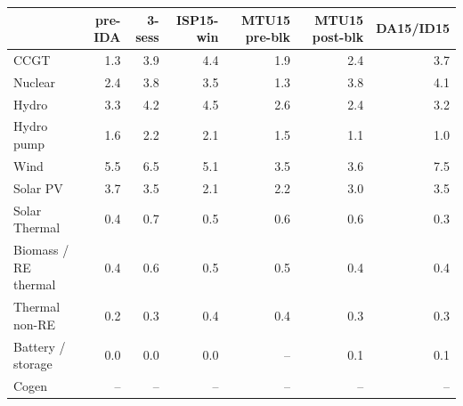 \begin{tabular}{l r r r r r r }
\toprule
 & \textbf{pre-IDA} & \textbf{3-sess} & \textbf{ISP15-win} & \textbf{MTU15 pre-blk} & \textbf{MTU15 post-blk} & \textbf{DA15/ID15} \\
\midrule
CCGT & 1.3 & 3.9 & 4.4 & 1.9 & 2.4 & 3.7 \\
Nuclear & 2.4 & 3.8 & 3.5 & 1.3 & 3.8 & 4.1 \\
Hydro & 3.3 & 4.2 & 4.5 & 2.6 & 2.4 & 3.2 \\
Hydro pump & 1.6 & 2.2 & 2.1 & 1.5 & 1.1 & 1.0 \\
Wind & 5.5 & 6.5 & 5.1 & 3.5 & 3.6 & 7.5 \\
Solar PV & 3.7 & 3.5 & 2.1 & 2.2 & 3.0 & 3.5 \\
Solar Thermal & 0.4 & 0.7 & 0.5 & 0.6 & 0.6 & 0.3 \\
Biomass / RE thermal & 0.4 & 0.6 & 0.5 & 0.5 & 0.4 & 0.4 \\
Thermal non-RE & 0.2 & 0.3 & 0.4 & 0.4 & 0.3 & 0.3 \\
Battery / storage & 0.0 & 0.0 & 0.0 & -- & 0.1 & 0.1 \\
Cogen & -- & -- & -- & -- & -- & -- \\
\bottomrule
\end{tabular}
